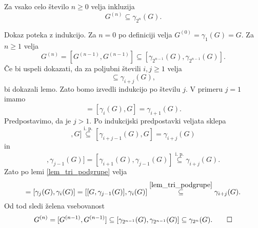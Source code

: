 \begin{lema}
\label{lem_povezava_med_spodnjo_in_izpeljano_vrsto}
Za vsako celo število $n \ge 0$ velja inkluzija
\begin{equation*}
G^{(n)} \subseteq \gamma_{2^{n}}(G).
\end{equation*}    
\end{lema}
\begin{dokaz}
Dokaz poteka z indukcijo. Za $n = 0$ po definiciji velja $G^{(0)} = \gamma_{1}(G) = G$. Za $n \ge 1$ velja
\begin{equation*}
G^{(n)} = [G^{(n - 1)}, G^{(n - 1)}] \subseteq [\gamma_{2^{n - 1}}(G), \gamma_{2^{n - 1}}(G)].
\end{equation*}  
Če bi uspeli dokazati, da za poljubni števili $i, j \ge 1$ velja \begin{equation*}
[\gamma_i(G), \gamma_j(G)] \subseteq \gamma_{i + j}(G),  
\end{equation*}  
bi dokazali lemo. Zato bomo izvedli indukcijo po številu $j$. V primeru $j = 1$ imamo \begin{equation*}
    [\gamma_i(G), \gamma_1(G)] = [\gamma_i(G), G] = \gamma_{i + 1}(G).
\end{equation*}  
  Predpostavimo, da je $j > 1$. 
    Po indukcijski predpostavki veljata sklepa \begin{equation*}
    [[\gamma_{j -1}(G), \gamma_i(G)], G] \stackrel{\text{i.~p.}}{\subseteq} [\gamma_{i + j -1}(G), G] = \gamma_{i + j}(G)
    \end{equation*}  
    in \begin{equation*}
    [[\gamma_i(G), G], \gamma_{j -1}(G)]  = [\gamma_{i + 1}(G), \gamma_{j - 1}(G)] \stackrel{\text{i.~p.}}{\subseteq} \gamma_{i + j}(G).
    \end{equation*}  
    Zato po lemi \ref{lem_tri_podgrupe} velja \begin{equation*}
        [\gamma_i(G), \gamma_j(G)] = [\gamma_j(G), \gamma_i(G)] = [[G, \gamma_{j- 1}(G)], \gamma_{i}(G)] \stackrel{\ref{lem_tri_podgrupe}}{\subseteq}  \gamma_{i + j}(G).  
    \end{equation*}  
    Od tod sledi želena vsebovanost \begin{equation*}
        G^{(n)} = [G^{(n - 1)}, G^{(n - 1)}] \subseteq [\gamma_{2^{n - 1}}(G), \gamma_{2^{n - 1}}(G)] \subseteq \gamma_{2^n}(G). \qedhere
        \end{equation*}
\end{dokaz}


